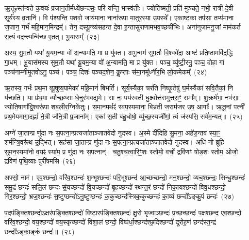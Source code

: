 ऋ॒तूꣴस्त॑न्वते क॒वयः॑ प्रजान॒तीर्मध्ये॑छन्दसः॒ परि॑ यन्ति॒ भास्व॑तीः। ज्योति॑ष्मती॒ प्रति॑ मुञ्चते॒ नभो॒ रात्री॑ दे॒वी सूर्य॑स्य व्र॒तानि॑। वि प॑श्यन्ति प॒शवो॒ जाय॑माना॒ नाना॑रूपा मा॒तुर॒स्या उ॒पस्थे᳚। ए॒का॒ष्ट॒का तप॑सा॒ तप्य॑माना ज॒जान॒ गर्भं॑ महि॒मान॒मिन्द्रम्᳚। तेन॒ दस्यू॒न्व्य॑सहन्त दे॒वा ह॒न्तासु॑राणामभव॒च्छची॑भिः। अना॑नुजामनु॒जां माम॑कर्त स॒त्यं वद॒न्त्यन्वि॑च्छ ए॒तत्। भू॒यासम्᳚~(२३)

अ॒स्य॒ सु॒म॒तौ यथा॑ यू॒यम॒न्या वो॑ अ॒न्यामति॒ मा प्र यु॑क्त। अभू॒न्मम॑ सुम॒तौ वि॒श्ववे॑दा॒ आष्ट॑ प्रति॒ष्ठामवि॑द॒द्धि गा॒धम्। भू॒यास॑मस्य सुम॒तौ यथा॑ यू॒यम॒न्या वो॑ अ॒न्यामति॒ मा प्र यु॑क्त। पञ्च॒ व्यु॑ष्टी॒रनु॒ पञ्च॒ दोहा॒ गां पञ्च॑नाम्नीमृ॒तवो\-ऽनु॒ पञ्च॑। पञ्च॒ दिशः॑ पञ्चद॒शेन॒ कॢ॒प्ताः स॑मा॒नमू᳚र्ध्नीर॒भि लो॒कमेकम्᳚~(२४)

ऋ॒तस्य॒ गर्भः॑ प्रथ॒मा व्यू॒षुष्य॒पामेका॑ महि॒मानं॑ बिभर्ति। सूर्य॒स्यैका॒ चर॑ति निष्कृ॒तेषु॑ घ॒र्मस्यैका॑ सवि॒तैकां॒ नि य॑च्छति। या प्र॑थ॒मा व्यौच्छ॒थ्सा धे॒नुर॑भवद्य॒मे। सा नः॒ पय॑स्वती धु॒क्ष्वोत्त॑रामुत्तरा॒ꣳ॒ समा᳚म्। शु॒क्रर्\mbox{}ष॑भा॒ नभ॑सा॒ ज्योति॒षागा᳚द्वि॒श्वरू॑पा शब॒लीर॒ग्निके॑तुः। स॒मा॒नमर्थꣴ॑ स्वप॒स्यमा॑ना॒ बिभ्र॑ती ज॒राम॑जर उष॒ आगाः᳚। ऋ॒तू॒नां पत्नी᳚ प्रथ॒मेयमागा॒दह्नां᳚ ने॒त्री ज॑नि॒त्री प्र॒जाना᳚म्। एका॑ स॒ती ब॑हु॒धोषो॒ व्यु॑च्छ॒स्यजी᳚र्णा॒ त्वं ज॑रयसि॒ सर्व॑म॒न्यत्॥~(२५)

{\anuvakamend[{ऊर्ज॒मेका᳚ प्रतिमु॒ञ्चमा॑ना भू॒यास॒मेकं॒ पत्न्येका॒न्नविꣳ॑श॒तिश्च॑}]}%

अग्ने॑ जा॒तान्प्र णु॑दा नः स॒पत्ना॒न्प्रत्यजा॑ताञ्जातवेदो नुदस्व। अ॒स्मे दी॑दिहि सु॒मना॒ अहे॑ड॒न्तव॑ स्या॒ꣳ॒ शर्म॑न्त्रि॒वरू॑थ उ॒द्भित्। सह॑सा जा॒तान्प्र णु॑दा नः स॒पत्ना॒न्प्रत्यजा॑ताञ्जातवेदो नुदस्व। अधि॑ नो ब्रूहि सुमन॒स्यमा॑नो व॒यꣴ स्या॑म॒ प्र णु॑दा नः स॒पत्नान्॑। च॒तु॒श्च॒त्वा॒रि॒ꣳ॒शः स्तोमो॒ वर्चो॒ द्रवि॑णꣳ षोड॒शः स्तोम॒ ओजो॒ द्रवि॑णं पृथि॒व्याः पुरी॑षमसि~(२६)

अफ्सो॒ नाम॑। एव॒श्छन्दो॒ वरि॑व॒श्छन्दः॑ श॒म्भूश्छन्दः॑ परि॒भूश्छन्द॑ आ॒च्छच्छन्दो॒ मन॒श्छन्दो॒ व्यच॒श्छन्दः॒ सिन्धु॒श्छन्दः॑ समु॒द्रं छन्दः॑ सलि॒लं छन्दः॑ सं॒यच्छन्दो॑ वि॒यच्छन्दो॑ बृ॒हच्छन्दो॑ रथन्त॒रं छन्दो॑ निका॒यश्छन्दो॑ विव॒धश्छन्दो॒ गिर॒श्छन्दो॒ भ्रज॒श्छन्दः॑ स॒ष्टुप्छन्दो॑\-ऽनु॒ष्टुप्छन्दः॑ क॒कुच्छन्द॑स्त्रिक॒कुच्छन्दः॑ का॒व्यं छन्दो᳚\-ऽङ्कु॒पं छन्दः॑~(२७)

प॒दप॑ङ्क्ति॒श्छन्दो॒\-ऽक्षर॑पङ्क्ति॒श्छन्दो॑ विष्टा॒रप॑ङ्क्ति॒श्छन्दः॑ क्षु॒रो भृज्वा॒ञ्छन्दः॑ प्र॒च्छच्छन्दः॑ प॒क्षश्छन्द॒ एव॒श्छन्दो॒ वरि॑व॒श्छन्दो॒ वय॒श्छन्दो॑ वय॒स्कृच्छन्दो॑ विशा॒लं छन्दो॒ विष्प॑र्धा॒श्छन्द॑श्छ॒दिश्छन्दो॑ दूरोह॒णं छन्द॑स्त॒न्द्रं छन्दो᳚\-ऽङ्का॒ङ्कं छन्दः॑॥~(२८)

